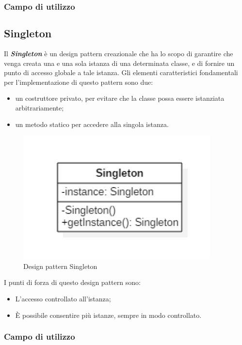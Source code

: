 \subsubsection{Campo di utilizzo}

\subsection{Singleton}
Il \textbf{\textit{Singleton}} è un design pattern creazionale che ha lo scopo di garantire che venga creata una e una sola istanza di una determinata classe, e di fornire un punto di accesso globale a tale istanza.
Gli elementi caratteristici fondamentali per l'implementazione di questo pattern sono due:
\begin{itemize}
	\item un costruttore privato, per evitare che la classe possa essere istanziata arbitrariamente;
	\item un metodo statico per accedere alla singola istanza.
\end{itemize}
\begin{figure}[H]
	\centering
	\includegraphics[width=0.4\linewidth]{IMG/singleton_pattern}
	\caption{Design pattern Singleton}
\end{figure}

I punti di forza di questo design pattern sono:
\begin{itemize}
	\item L'accesso controllato all'istanza;
	\item \MakeUppercase{è} possibile consentire più istanze, sempre in modo controllato.
\end{itemize}

\subsubsection{Campo di utilizzo}

